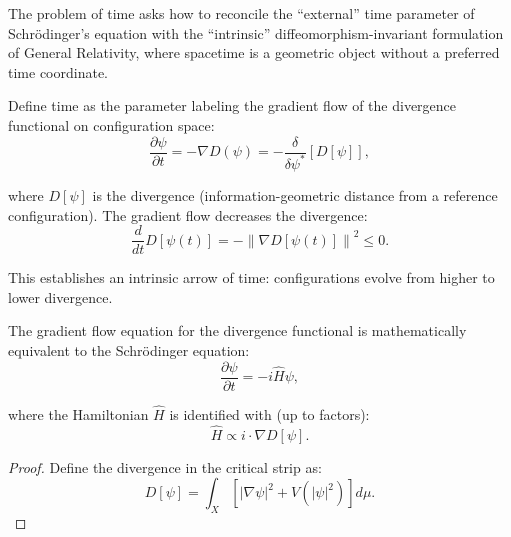 \begin{theorem}
\label{thm:problemOfTime}

The problem of time asks how to reconcile the ``external'' time parameter of Schrödinger's equation with the ``intrinsic'' diffeomorphism-invariant formulation of General Relativity, where spacetime is a geometric object without a preferred time coordinate.

\begin{definition}

Define time as the parameter labeling the gradient flow of the divergence functional on configuration space:
\begin{equation}
\frac{\partial \psi}{\partial t} = -\nabla D(\psi) = -\frac{\delta}{\delta \psi^*}\left[D[\psi]\right],
\end{equation}

where $D[\psi]$ is the divergence (information-geometric distance from a reference configuration). The gradient flow decreases the divergence:
\begin{equation}
\frac{d}{dt} D[\psi(t)] = -\left\|\nabla D[\psi(t)]\right\|^2 \leq 0.
\end{equation}

This establishes an intrinsic arrow of time: configurations evolve from higher to lower divergence.

\end{definition}

\begin{theorem}
\label{thm:schrodingerFromGradientFlow}

The gradient flow equation for the divergence functional is mathematically equivalent to the Schrödinger equation:
\begin{equation}
\frac{\partial \psi}{\partial t} = -i\hat{H}\psi,
\end{equation}

where the Hamiltonian $\hat{H}$ is identified with (up to factors):
\begin{equation}
\hat{H} \propto i \cdot \nabla D[\psi].
\end{equation}

\begin{proof}

Define the divergence in the critical strip as:
\begin{equation}
D[\psi] = \int_X \left[|\nabla \psi|^2 + V(|\psi|^2) \right] d\mu.
\end{equation}


\end{proof}
\end{theorem}
\end{theorem}
